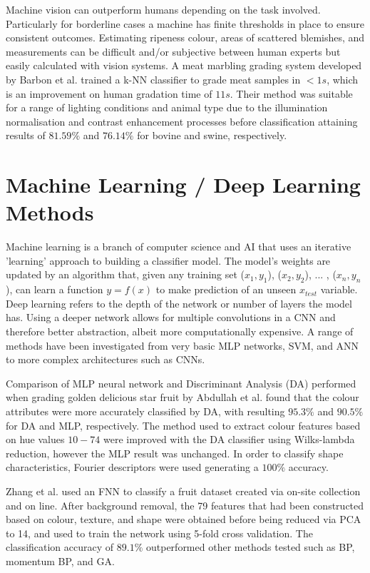 \documentclass[fleqn,twoside,12pt]{report}
\begin{document}
Machine vision can outperform humans depending on the task involved. Particularly for borderline cases a machine has finite thresholds in place to ensure consistent outcomes. Estimating ripeness colour, areas of scattered blemishes, and measurements can be difficult and/or subjective between human experts but easily calculated with vision systems. A meat marbling grading system developed by Barbon et al.\cite{barbon} trained a k-NN classifier to grade meat samples in $<1s$, which is an improvement on human gradation time of $11s$. Their method was suitable for a range of lighting conditions and animal type due to the illumination normalisation and contrast enhancement processes before classification attaining results of $81.59\%$ and $76.14\%$ for bovine and swine, respectively. 



\section{Machine Learning / Deep Learning Methods}


Machine learning is a branch of computer science and AI that uses an iterative 'learning' approach to building a classifier model. The model's weights are updated by an algorithm that, given any training set ($x_1, y_1$), ($x_2, y_2$), ... , ($x_n, y_n$), can learn a function $y = f(x)$ to make prediction of an unseen $x_{test}$ variable. Deep learning refers to the depth of the network or number of layers the model has. Using a deeper network allows for multiple convolutions in a CNN and therefore better abstraction, albeit more computationally expensive. A range of methods have been investigated from very basic MLP networks, SVM, and ANN to more complex architectures such as CNNs.


Comparison of MLP neural network and Discriminant Analysis (DA) performed when grading golden delicious star fruit by Abdullah et al.\cite{abdullah} found that the colour attributes were more accurately classified by DA, with resulting $95.3\%$ and $90.5\%$ for DA and MLP, respectively. The method used to extract colour features based on hue values $10-74$ were improved with the DA classifier using Wilks-lambda reduction, however the MLP result was unchanged. In order to classify shape characteristics, Fourier descriptors were used generating a $100\%$ accuracy.


Zhang et al.\cite{zhang} used an FNN to classify a fruit dataset created via on-site collection and on line. After background removal, the 79 features that had been constructed based on colour, texture, and shape were obtained before being reduced via PCA to 14, and used to train the network using 5-fold cross validation. The classification accuracy of $89.1\%$ outperformed other methods tested such as BP, momentum BP, and GA. 
\end{document}
